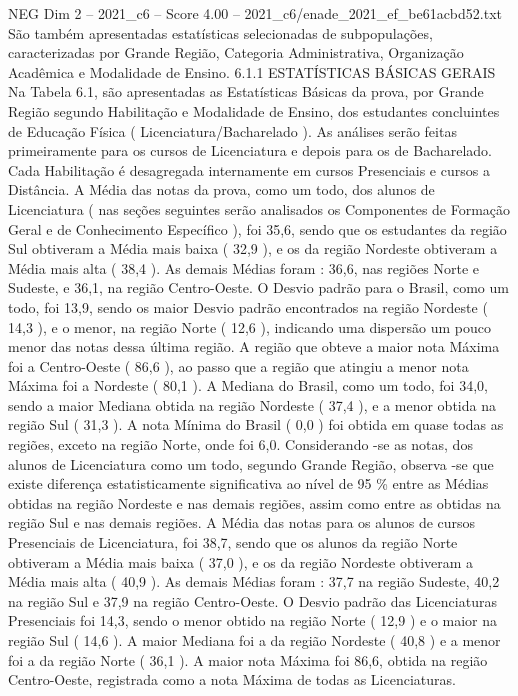 \begin{textsample}{NEG Dim 2 – 2021\_c6 – Score 4.00 – 2021\_c6/enade\_2021\_ef\_be61acbd52.txt}
São também apresentadas estatísticas selecionadas de subpopulações, caracterizadas por Grande Região, Categoria Administrativa, Organização Acadêmica e Modalidade de Ensino. 6.1.1 ESTATÍSTICAS BÁSICAS GERAIS Na Tabela 6.1, são apresentadas as Estatísticas Básicas da prova, por Grande Região segundo Habilitação e Modalidade de Ensino, dos estudantes concluintes de Educação Física ( Licenciatura/Bacharelado ).
As análises serão feitas primeiramente para os cursos de Licenciatura e depois para os de Bacharelado.
Cada Habilitação é desagregada internamente em cursos Presenciais e cursos a Distância.
A Média das notas da prova, como um todo, dos alunos de Licenciatura ( nas seções seguintes serão analisados os Componentes de Formação Geral e de Conhecimento Específico ), foi 35,6, sendo que os estudantes da região Sul obtiveram a Média mais baixa ( 32,9 ), e os da região Nordeste obtiveram a Média mais alta ( 38,4 ).
As demais Médias foram : 36,6, nas regiões Norte e Sudeste, e 36,1, na região Centro-Oeste.
O Desvio padrão para o Brasil, como um todo, foi 13,9, sendo os maior Desvio padrão encontrados na região Nordeste ( 14,3 ), e o menor, na região Norte ( 12,6 ), indicando uma dispersão um pouco menor das notas dessa última região.
A região que obteve a maior nota Máxima foi a Centro-Oeste ( 86,6 ), ao passo que a região que atingiu a menor nota Máxima foi a Nordeste ( 80,1 ).
A Mediana do Brasil, como um todo, foi 34,0, sendo a maior Mediana obtida na região Nordeste ( 37,4 ), e a menor obtida na região Sul ( 31,3 ).
A nota Mínima do Brasil ( 0,0 ) foi obtida em quase todas as regiões, exceto na região Norte, onde foi 6,0.
Considerando -se as notas, dos alunos de Licenciatura como um todo, segundo Grande Região, observa -se que existe diferença estatisticamente significativa ao nível de 95 \% entre as Médias obtidas na região Nordeste e nas demais regiões, assim como entre as obtidas na região Sul e nas demais regiões.
A Média das notas para os alunos de cursos Presenciais de Licenciatura, foi 38,7, sendo que os alunos da região Norte obtiveram a Média mais baixa ( 37,0 ), e os da região Nordeste obtiveram a Média mais alta ( 40,9 ).
As demais Médias foram : 37,7 na região Sudeste, 40,2 na região Sul e 37,9 na região Centro-Oeste.
O Desvio padrão das Licenciaturas Presenciais foi 14,3, sendo o menor obtido na região Norte ( 12,9 ) e o maior na região Sul ( 14,6 ).
A maior Mediana foi a da região Nordeste ( 40,8 ) e a menor foi a da região Norte ( 36,1 ).
A maior nota Máxima foi 86,6, obtida na região Centro-Oeste, registrada como a nota Máxima de todas as Licenciaturas.

\end{textsample}
